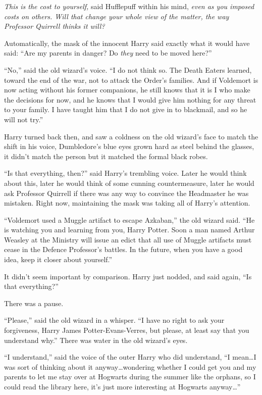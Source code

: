 \emph{This is the cost to yourself,} said Hufflepuff within his mind,
\emph{even as you imposed costs on others. Will that change your whole view of
the matter, the way Professor Quirrell thinks it will?}

Automatically, the mask of the innocent Harry said exactly what it would have
said: “Are my parents in danger? Do \emph{they} need to be moved here?”

“No,” said the old wizard’s voice. “I do not think so. The Death Eaters
learned, toward the end of the war, not to attack the Order’s families. And if
Voldemort is now acting without his former companions, he still knows that it
is I who make the decisions for now, and he knows that I would give him nothing
for any threat to your family. I have taught him that I do not give in to
blackmail, and so he will not try.”

Harry turned back then, and saw a coldness on the old wizard’s face to match
the shift in his voice, Dumbledore’s blue eyes grown hard as steel behind the
glasses, it didn’t match the person but it matched the formal black robes.

“Is that everything, then?” said Harry’s trembling voice. Later he would think
about this, later he would think of some cunning countermeasure, later he would
ask Professor Quirrell if there was any way to convince the Headmaster he was
mistaken. Right now, maintaining the mask was taking all of Harry’s attention.

“Voldemort used a Muggle artifact to escape Azkaban,” the old wizard said. “He
is watching you and learning from you, Harry Potter. Soon a man named Arthur
Weasley at the Ministry will issue an edict that all use of Muggle artifacts
must cease in the Defence Professor’s battles. In the future, when you have a
good idea, keep it closer about yourself.”

It didn’t seem important by comparison. Harry just nodded, and said again, “Is
that everything?”

There was a pause.

“Please,” said the old wizard in a whisper. “I have no right to ask your
forgiveness, Harry James Potter-Evans-Verres, but please, at least say that you
understand why.” There was water in the old wizard’s eyes.

“I understand,” said the voice of the outer Harry who did understand, “I
mean…I was sort of thinking about it anyway…wondering whether I
could get you and my parents to let me stay over at Hogwarts during the summer
like the orphans, so I could read the library here, it’s just more interesting
at Hogwarts anyway…”

